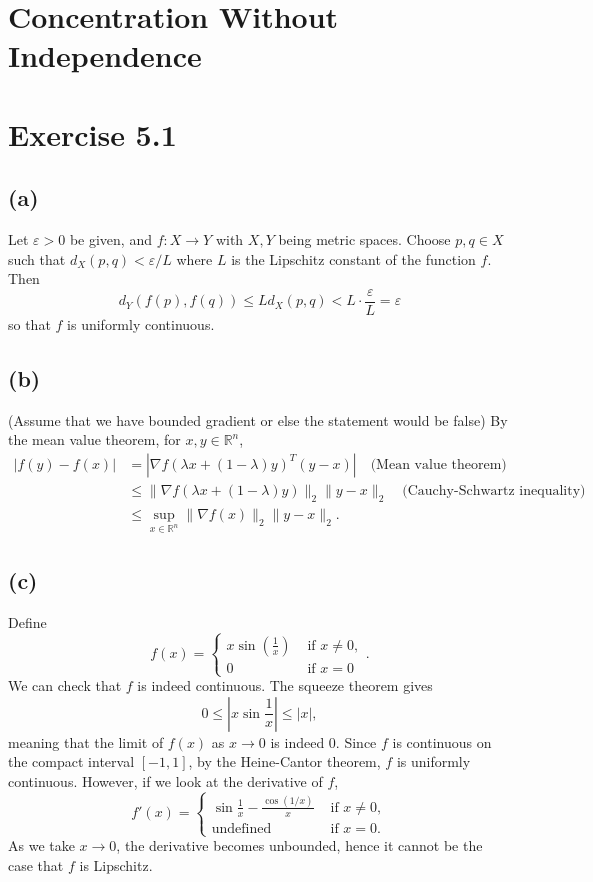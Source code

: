 \section{Concentration Without Independence}


\section*{Exercise 5.1}
\subsection*{(a)}
Let $\varepsilon > 0$ be given, and $f:X \to Y$ with $X, Y$ being metric spaces. Choose $p, q \in X$ such that 
$d_X(p, q) < \varepsilon / L$ where $L$ is the Lipschitz constant of the function $f$. Then 
\[ d_Y(f(p), f(q)) \leq L d_X(p, q) < L \cdot \frac{\varepsilon}{L} = \varepsilon \]
so that $f$ is uniformly continuous.

\subsection*{(b)}
(Assume that we have bounded gradient or else the statement would be false) By the mean value theorem, 
for $x, y \in \mathbb{R}^n$, 
\begin{align*}
	|f(y) - f(x)| 
	&= |\nabla f(\lambda x + (1 - \lambda)y)^T (y - x)| \quad \text{(Mean value theorem)} \\
	&\leq \lVert \nabla f(\lambda x + (1 - \lambda) y) \rVert_{2} \lVert y - x \rVert_{2} \quad 
	\text{(Cauchy-Schwartz inequality)} \\
	&\leq \sup_{x \in \mathbb{R}^n} \lVert \nabla f(x) \rVert_{2} \lVert y - x \rVert_{2}.
\end{align*}

\subsection*{(c)}
Define 
\[ f(x) = \begin{cases}
	x \sin{\left( \frac{1}{x} \right)} &\text{ if } x \neq 0, \\
	0 &\text{ if } x = 0
\end{cases}. \]
We can check that $f$ is indeed continuous. The squeeze theorem gives
\[ 0 \leq \left| x \sin{\frac{1}{x}} \right| \leq |x|, \]
meaning that the limit of $f(x)$ as $x \to 0$ is indeed 0.
Since $f$ is continuous on the compact interval $[-1, 1]$, by the Heine-Cantor theorem, $f$ is uniformly 
continuous. However, if we look at the derivative of $f$, 
\[ f'(x) = \begin{cases}
	\sin{\frac{1}{x}} - \frac{\cos{(1/x)}}{x} &\text{ if } x \neq 0, \\
	\text{undefined} &\text{ if } x = 0.
\end{cases} \]
As we take $x \to 0$, the derivative becomes unbounded, hence it cannot be the case that $f$ is Lipschitz.

